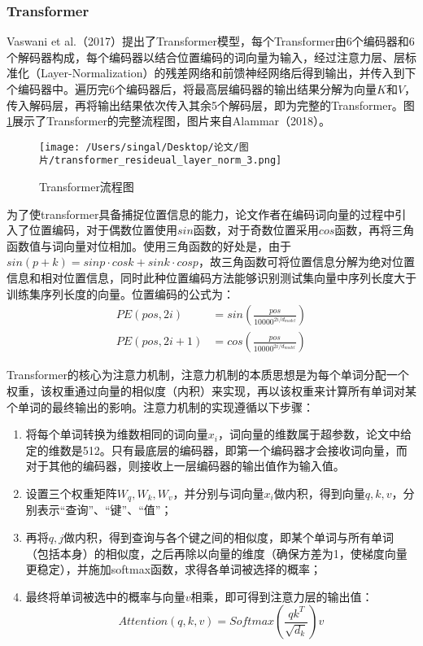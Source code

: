 \documentclass[lang=cn]{elegantpaper}
\begin{document}
\subsubsection{Transformer}
Vaswani et al.（2017）\cite{24}提出了Transformer模型，每个Transformer由6个编码器和6个解码器构成，每个编码器以结合位置编码的词向量为输入，经过注意力层、层标准化（Layer-Normalization）的残差网络和前馈神经网络后得到输出，并传入到下个编码器中。遍历完6个编码器后，将最高层编码器的输出结果分解为向量$K$和$V$，传入解码层，再将输出结果依次传入其余5个解码层，即为完整的Transformer。图\ref{图1}展示了Transformer的完整流程图，图片来自Alammar（2018）\cite{25}。

\begin{figure}[htb]
    \centering
    \texttt{[image: /Users/singal/Desktop/论文/图片/transformer\_resideual\_layer\_norm\_3.png]}
    \caption{Transformer流程图}
    \label{图1}
\end{figure}

为了使transformer具备捕捉位置信息的能力，论文作者在编码词向量的过程中引入了位置编码，对于偶数位置使用$sin$函数，对于奇数位置采用$cos$函数，再将三角函数值与词向量对位相加。使用三角函数的好处是，由于$sin(p+k)=sinp\cdot cosk+sink\cdot cosp$，故三角函数可将位置信息分解为绝对位置信息和相对位置信息，同时此种位置编码方法能够识别测试集向量中序列长度大于训练集序列长度的向量。位置编码的公式为：
\begin{align}
    PE(pos,2i)&=sin\left(\frac{pos}{10000^{2i/d_{model}}}\right)\\
    PE(pos,2i+1)&=cos\left(\frac{pos}{10000^{2i/d_{model}}}\right)
\end{align}

Transformer的核心为注意力机制，注意力机制的本质思想是为每个单词分配一个权重，该权重通过向量的相似度（内积）来实现，再以该权重来计算所有单词对某个单词的最终输出的影响。注意力机制的实现遵循以下步骤：
\begin{enumerate}
    \item 将每个单词转换为维数相同的词向量$x_i$，词向量的维数属于超参数，论文中给定的维数是512。只有最底层的编码器，即第一个编码器才会接收词向量，而对于其他的编码器，则接收上一层编码器的输出值作为输入值。
    \item 设置三个权重矩阵$W_q,W_k,W_v$，并分别与词向量$x_i$做内积，得到向量$q,k,v$，分别表示“查询”、“键”、“值”；
    \item 再将$q,j$做内积，得到查询与各个键之间的相似度，即某个单词与所有单词（包括本身）的相似度，之后再除以向量的维度（确保方差为1，使梯度向量更稳定），并施加softmax函数，求得各单词被选择的概率；
    \item 最终将单词被选中的概率与向量$v$相乘，即可得到注意力层的输出值：
    \begin{equation}
        Attention(q,k,v)=Softmax\left(\frac{qk^T}{\sqrt {d_k}}\right)v
    \end{equation}
\end{enumerate}
\end{document}
